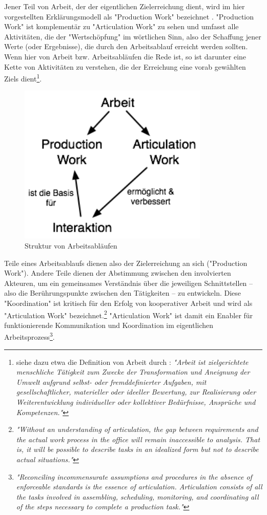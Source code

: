 Jener Teil von Arbeit, der der eigentlichen Zielerreichung dient, wird im hier vorgestellten Erklärungsmodell als "Production Work" bezeichnet \citep{Fujimura87}. "Production Work" ist komplementär zu "Articulation Work" zu sehen und umfasst alle Aktivitäten, die der "Wertschöpfung" im wörtlichen Sinn, also der Schaffung jener Werte (oder Ergebnisse), die durch den Arbeitsablauf erreicht werden sollten. Wenn hier von Arbeit bzw. Arbeitsabläufen die Rede ist, so ist darunter eine Kette von Aktivitäten zu verstehen, die der Erreichung eine vorab gewählten Ziels dient\footnote{siehe dazu etwa die Definition von Arbeit durch \citet{Semmer04}: \emph{"Arbeit ist zielgerichtete menschliche Tätigkeit zum Zwecke der Transformation und Aneignung der Umwelt aufgrund selbst- oder fremddefinierter Aufgaben, mit gesellschaftlicher, materieller oder ideeller Bewertung, zur Realisierung oder Weiterentwicklung individueller oder kollektiver Bedürfnisse, Ansprüche und Kompetenzen."}}. 

\begin{figure}[htbp]
	\centering
		\includegraphics[height=3in]{img/ArticulationWork/ArbeitInteraktion.png}
	\caption{Struktur von Arbeitsabläufen}
	\label{fig:img_ArticulationWork_ArbeitInteraktion}
\end{figure}

Teile eines Arbeitsablaufs dienen also der Zielerreichung an sich ("Production Work"). Andere Teile dienen der Abstimmung zwischen den involvierten Akteuren, um ein gemeinsames Verständnis über die jeweiligen Schnittstellen – also die Berührungspunkte zwischen den Tätigkeiten – zu entwickeln. Diese "Koordination" ist kritisch für den Erfolg von kooperativer Arbeit \citep{Strauss93} und wird als "Articulation Work" bezeichnet.\footnote{\emph{"Without an understanding of articulation, the gap between requirements and the actual work process in the office will remain inaccessible to analysis. That is, it will be possible to describe tasks in an idealized form but not to describe actual situations."}\citep{Gerson86}} "Articulation Work" ist damit ein Enabler für funktionierende Kommunikation und Koordination im eigentlichen Arbeitsprozess\footnote{\emph{"Reconciling incommensurate assumptions and procedures in the absence of enforceable standards is the essence of articulation. Articulation consists of all the tasks involved in assembling, scheduling, monitoring, and coordinating all of the steps necessary to complete a production task."}\citep{Gerson86}}. 

